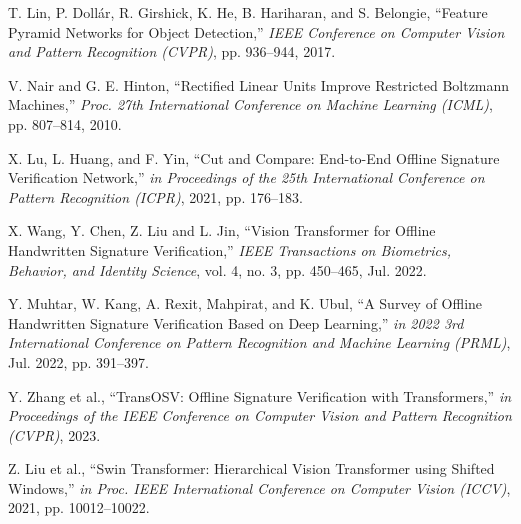 \begin{thebibliography}{10}
T. Lin, P. Dollár, R. Girshick, K. He, B. Hariharan, and S. Belongie, ``Feature Pyramid Networks for Object Detection,'' {\em IEEE Conference on Computer Vision and Pattern Recognition (CVPR)}, pp. 936--944,
2017.

V. Nair and G. E. Hinton, ``Rectified Linear Units Improve Restricted Boltzmann Machines,'' {\em Proc. 27th International Conference on Machine Learning (ICML)}, pp. 807--814,
2010.

X. Lu, L. Huang, and F. Yin, ``Cut and Compare: End-to-End Offline Signature Verification Network,'' {\em in Proceedings of the 25th International Conference on Pattern Recognition (ICPR)},
2021, pp. 176--183.

X. Wang, Y. Chen, Z. Liu and L. Jin, ``Vision Transformer for Offline Handwritten Signature Verification,'' {\em IEEE Transactions on Biometrics, Behavior, and Identity Science}, vol. 4, no. 3, pp. 450--465,
Jul. 2022.

Y. Muhtar, W. Kang, A. Rexit, Mahpirat, and K. Ubul, ``A Survey of Offline Handwritten Signature Verification Based on Deep Learning,'' {\em in 2022 3rd International Conference on Pattern Recognition and Machine Learning (PRML)},
Jul. 2022, pp. 391--397.

Y. Zhang et al., ``TransOSV: Offline Signature Verification with Transformers,'' {\em in Proceedings of the IEEE Conference on Computer Vision and Pattern Recognition (CVPR)},
2023.

Z. Liu et al., ``Swin Transformer: Hierarchical Vision Transformer using Shifted Windows,'' {\em in Proc. IEEE International Conference on Computer Vision (ICCV)},
2021, pp. 10012--10022.



\end{thebibliography}



























